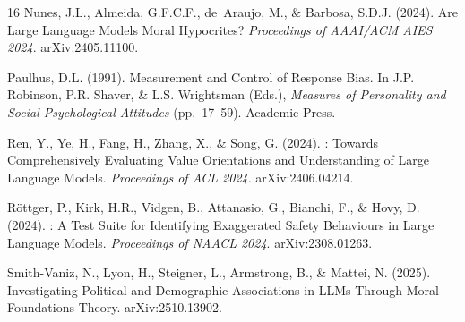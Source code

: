 \documentclass{article}
\begin{document}
\begin{thebibliography}{16}
Nunes, J.L., Almeida, G.F.C.F., de~Araujo, M., \& Barbosa, S.D.J. (2024).
\newblock Are Large Language Models Moral Hypocrites?
\newblock \emph{Proceedings of AAAI/ACM AIES 2024}. arXiv:2405.11100.

Paulhus, D.L. (1991).
\newblock Measurement and Control of Response Bias.
\newblock In J.P. Robinson, P.R. Shaver, \& L.S. Wrightsman (Eds.), \emph{Measures of Personality and Social Psychological Attitudes} (pp.\ 17--59). Academic Press.

Ren, Y., Ye, H., Fang, H., Zhang, X., \& Song, G. (2024).
: Towards Comprehensively Evaluating Value Orientations and Understanding of Large Language Models.
\newblock \emph{Proceedings of ACL 2024}. arXiv:2406.04214.

R{\"o}ttger, P., Kirk, H.R., Vidgen, B., Attanasio, G., Bianchi, F., \& Hovy, D. (2024).
: A Test Suite for Identifying Exaggerated Safety Behaviours in Large Language Models.
\newblock \emph{Proceedings of NAACL 2024}. arXiv:2308.01263.

Smith-Vaniz, N., Lyon, H., Steigner, L., Armstrong, B., \& Mattei, N. (2025).
\newblock Investigating Political and Demographic Associations in {LLMs} Through Moral Foundations Theory.
\newblock arXiv:2510.13902.

\end{thebibliography}
\end{document}
